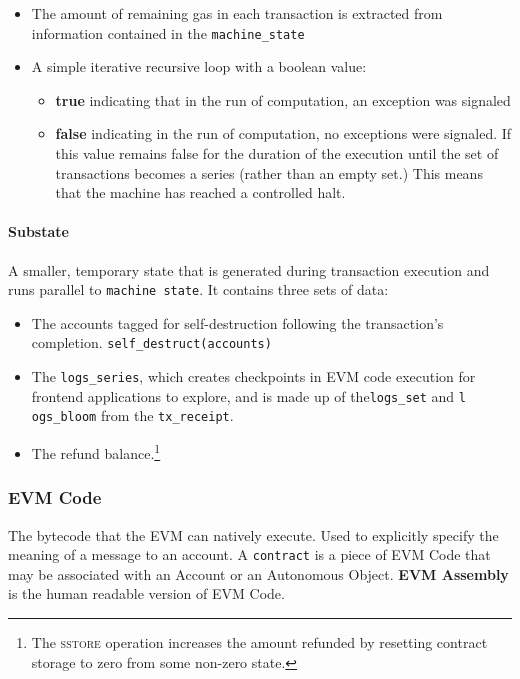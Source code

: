 \documentclass[10pt,a4paper,leqno,bibliography=totoc]{scrartcl}
\newenvironment{alphafootnotes}
{\par\edef\savedfootnotenumber{\number\value{footnote}}
\renewcommand{\thefootnote}{\alph{footnote}}
\setcounter{footnote}{0}}
{\par\setcounter{footnote}{\savedfootnotenumber}}
\begin{document}
\begin{alphafootnotes}
\begin{multicols*}{2}
		\begin{itemize}
			\item The amount of remaining gas in each transaction is extracted from information contained in the \texttt{machine\_state} 
			\item A simple iterative recursive  loop\supercite{Wood2017} with a boolean  value: 
		\begin{itemize}
				\item\textbf{true} indicating that in the run of computation, an exception was signaled
				\item\textbf{false} indicating in the run of computation, no exceptions were signaled. If this value remains false for the duration of the execution until the set of transactions becomes a series (rather than an empty set.) This means that the machine has reached a controlled halt. 
			\end{itemize}
		\end{itemize}

				\paragraph{Substate}
				
				 A smaller, temporary state that is generated during transaction execution and runs parallel to \texttt{machine state}. It contains three sets of data:
				
				\begin{itemize}
					\item The accounts tagged for self-destruction following the transaction's completion. \texttt{self\_destruct(accounts)}
					\item The \texttt{logs\_series}, which creates checkpoints in EVM code execution for frontend applications to explore, and is made up of the\texttt{logs\_set} and \texttt{l
						ogs\_bloom} from the \texttt{tx\_receipt}.
					\item The refund balance.\footnote{The \textsc{sstore} operation increases the amount refunded by resetting contract storage to zero from some non-zero state.}
				\end{itemize}
				

			\subsubsection{EVM Code}
				The bytecode that the EVM can natively execute. Used to explicitly specify the meaning of a message to an account. A \texttt{contract} is a piece of EVM Code that may be associated with an Account or an Autonomous Object. \textbf{EVM Assembly} is the human readable version of EVM Code.

\end{multicols*}
\end{alphafootnotes}
\end{document}
